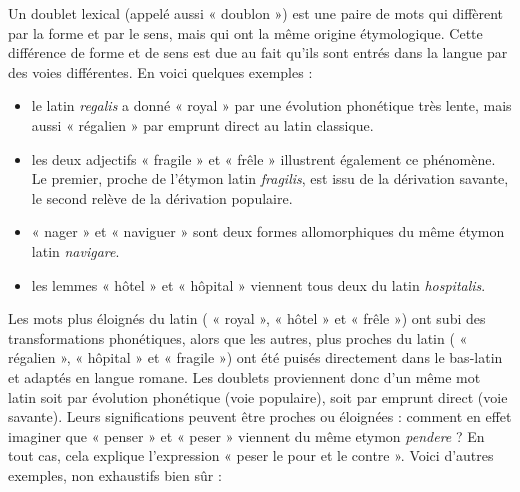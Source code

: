 Un doublet lexical (appelé aussi « doublon ») est une paire de mots qui diffèrent par la forme et par le sens, mais qui ont la même origine étymologique. Cette différence de forme et de sens est due au fait qu’ils sont entrés dans la langue par des voies différentes. En voici quelques exemples :
\begin{itemize}
\item le latin \textit{regalis} a donné « royal » par une évolution phonétique très lente, mais aussi « régalien » par emprunt direct au latin classique.
\item les deux adjectifs « fragile » et « frêle » illustrent également ce phénomène. Le premier, proche de l’étymon latin \textit{fragilis}, est issu de la dérivation savante, le second relève de la dérivation populaire.
\item « nager » et « naviguer » sont deux formes allomorphiques du même étymon latin \textit{navigare}.
\item les lemmes « hôtel » et « hôpital » viennent tous deux du latin \textit{hospitalis}.
\end{itemize}
Les mots plus éloignés du latin ( « royal », « hôtel » et « frêle ») ont subi des transformations phonétiques, alors que les autres, plus proches du latin ( « régalien », « hôpital » et « fragile ») ont été puisés directement dans le bas-latin et adaptés en langue romane. Les doublets proviennent donc d’un même mot latin soit par évolution phonétique (voie populaire), soit par emprunt direct (voie savante). Leurs significations peuvent être proches ou éloignées : comment en effet imaginer que « penser » et « peser » viennent du même etymon \textit{pendere} ? En tout cas, cela explique l’expression « peser le pour et le contre ». Voici d’autres exemples, non exhaustifs bien sûr :

